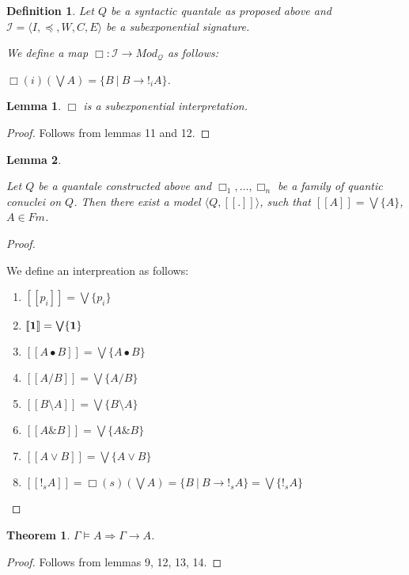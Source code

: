 \documentclass[a4paper]{article}
\newtheorem{theorem}{Theorem}
\newtheorem{lemma}{Lemma}
\newtheorem{defin}{Definition}
\begin{document}
\begin{defin} Let $Q$ be a syntactic quantale as proposed above and
  $\mathcal{I} = \langle I, \preceq, W, C, E \rangle$ be a subexponential signature.

  We define a map $\Box : \mathcal{I} \to Mod_{\mathcal{Q}}$ as follows:

  $\Box(i)(\bigvee A) = \{ B \: | \: B \rightarrow !_i A \}$.
\end{defin}

\begin{lemma} $\Box$ is a subexponential interpretation.
\end{lemma}

\begin{proof}
  Follows from lemmas 11 and 12.
\end{proof}

\begin{lemma}
$ $

  Let $Q$ be a quantale constructed above and $\Box_1, \dots, \Box_n$ be a family of quantic conuclei on $Q$.
  Then there exist a model $\langle Q, [\![.]\!]\rangle$, such that $[\![A]\!] = \bigvee \{ A \}$, $A \in Fm$.
\end{lemma}

\begin{proof}
$ $

  We define an interpreation as follows:

\begin{enumerate}
  \item $[\![p_i]\!] = \bigvee \{ p_i \}$
  \item $[\![{\bf 1}]\!] = \bigvee \{ {\bf 1} \}$
  \item $[\![A \bullet B]\!] = \bigvee \{ A \bullet B \}$
  \item $[\![A / B]\!] = \bigvee \{ A / B \}$
  \item $[\![B \setminus A]\!] = \bigvee \{ B \setminus A \}$
  \item $[\![A \& B ]\!] = \bigvee \{ A \& B \}$
  \item $[\![A \lor B]\!] = \bigvee \{ A \lor B\}$
  \item $[\![!_s A]\!] = \Box(s) (\bigvee A) = \{ B \: | \: B \rightarrow !_s A \} = \bigvee \{ !_s A \}$
\end{enumerate}
\end{proof}

\begin{theorem}
  $\Gamma \models A \Rightarrow \Gamma \rightarrow A$.
\end{theorem}

\begin{proof}
  Follows from lemmas 9, 12, 13, 14.
\end{proof}
\end{document}
